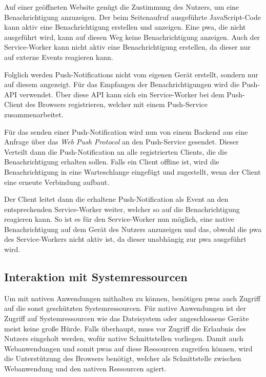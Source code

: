 \documentclass[12pt, parskip=half]{scrartcl}       %
\begin{document}
Auf einer geöffneten Website genügt die Zustimmung des Nutzers, um eine Benachrichtigung anzuzeigen.
Der beim Seitenaufruf ausgeführte JavaScript-Code kann aktiv eine Benachrichtigung erstellen und anzeigen.
Eine \ac{pwa}, die nicht ausgeführt wird, kann auf diesen Weg keine Benachrichtigung anzeigen.
Auch der Service-Worker kann nicht aktiv eine Benachrichtigung erstellen, da dieser nur auf externe Events reagieren kann.

Folglich werden Push-Notifications nicht vom eigenen Gerät erstellt, sondern nur auf diesem angezeigt.
Für das Empfangen der Benachrichtigungen wird die Push-API\cite{w3c_pushapi} verwendet.
Über diese API kann sich ein Service-Worker bei dem Push-Client des Browsers registrieren, welcher mit einem Push-Service zusammenarbeitet.



Für das senden einer Push-Notification wird nun von einem Backend aus eine Anfrage über das \textit{Web Push Protocol}\cite{ietf_webpush} an den Push-Service gesendet.
Dieser Verteilt dann die Push-Notification an alle registrierten Clients, die die Benachrichtigung erhalten sollen.
Falls ein Client offline ist, wird die Benachrichtigung in eine Warteschlange eingefügt und zugestellt, wenn der Client eine erneute Verbindung aufbaut.\cite{googledev_webpush}


Der Client leitet dann die erhaltene Push-Notification als Event an den entsprechenden Service-Worker weiter, welcher so auf die Benachrichtigung reagieren kann.
So ist es für den Service-Worker nun möglich, eine native Benachrichtigung auf dem Gerät des Nutzers anzuzeigen und das, obwohl die \ac{pwa} des Service-Workers nicht aktiv ist, da dieser unabhängig zur \ac{pwa} ausgeführt wird.


\subsection{Interaktion mit Systemressourcen}

Um mit nativen Anwendungen mithalten zu können, benötigen \acp{pwa} auch Zugriff auf die sonst geschützten Systemressourcen.
Für native Anwendungen ist der Zugriff auf Systemressourcen wie das Dateisystem oder angeschlossene Geräte meist keine große Hürde.
Falls überhaupt, muss vor Zugriff die Erlaubnis des Nutzers eingeholt werden, wofür native Schnittstellen vorliegen.
Damit auch Webanwendungen und somit \acp{pwa} auf diese Ressourcen zugreifen können, wird die Unterstützung des Browsers benötigt, welcher als Schnittstelle zwischen Webanwendung und den nativen Ressourcen agiert.
\end{document}
